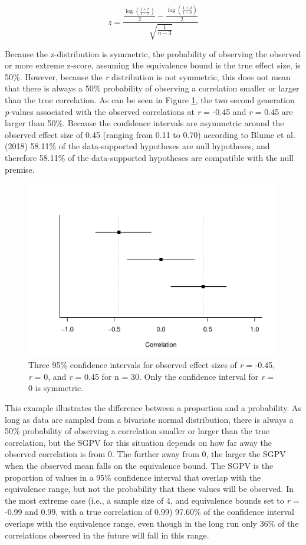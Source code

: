 \documentclass[,man,floatsintext]{apa6}
\begin{document}
\[
z = \frac{\frac{\log(\frac{1 + r}{ 1 - r})}{2} - \frac{\log(\frac{1 + \rho}{ 1 - \rho})}{2}}{\sqrt{\frac{1}{n-3}}}
\]

Because the z-distribution is symmetric, the probability of observing the observed or more extreme z-score, assuming the equivalence bound is the true effect size, is 50\%. However, because the \emph{r} distribution is not symmetric, this does not mean that there is always a 50\% probability of observing a correlation smaller or larger than the true correlation. As can be seen in Figure \ref{fig:TOSTSGPV12}, the two second generation \emph{p}-values associated with the observed correlations at \emph{r} = -0.45 and \emph{r} = 0.45 are larger than 50\%. Because the confidence intervals are asymmetric around the observed effect size of 0.45 (ranging from 0.11 to 0.70) according to Blume et al. (2018) 58.11\% of the data-supported hypotheses are null hypotheses, and therefore 58.11\% of the data-supported hypotheses are compatible with the null premise.

\begin{figure}
\centering
\includegraphics{manuscript.R2_files/figure-latex/TOSTSGPV12-1.pdf}
\caption{\label{fig:TOSTSGPV12}Three 95\% confidence intervals for observed effect sizes of \emph{r} = -0.45, \emph{r} = 0, and \emph{r} = 0.45 for n = 30. Only the confidence interval for \emph{r} = 0 is symmetric.}
\end{figure}

This example illustrates the difference between a proportion and a probability. As long as data are sampled from a bivariate normal distribution, there is always a 50\% probability of observing a correlation smaller or larger than the true correlation, but the SGPV for this situation depends on how far away the observed correlation is from 0. The further away from 0, the larger the SGPV when the observed mean falls on the equivalence bound. The SGPV is the proportion of values in a 95\% confidence interval that overlap with the equivalence range, but not the probability that these values will be observed. In the most extreme case (i.e., a sample size of 4, and equivalence bounds set to \emph{r} = -0.99 and 0.99, with a true correlation of 0.99) 97.60\% of the confidence interval overlaps with the equivalence range, even though in the long run only 36\% of the correlations observed in the future will fall in this range.
\end{document}
